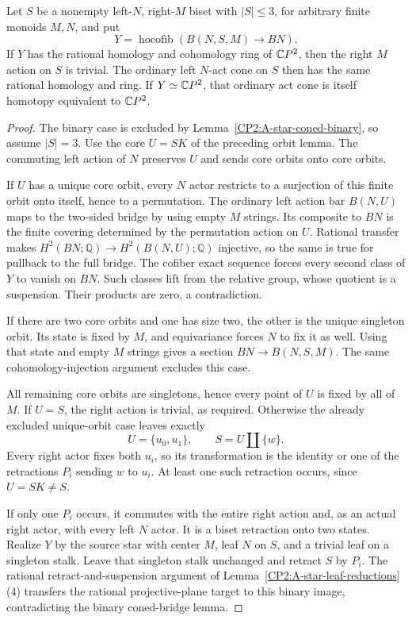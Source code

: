 \begin{theorem}
\label{CP2:A-coned-three-transfer-to-ordinary}
Let $S$ be a nonempty left-$N$, right-$M$ biset with
$|S|\leq3$, for arbitrary finite monoids $M,N$, and put
\[
 Y=\operatorname{hocofib}(B(N,S,M)\longrightarrow BN).
\]
If $Y$ has the rational homology and cohomology ring of
$\mathbb{C}P^2$, then the right $M$ action on $S$ is trivial.
The ordinary left $N$-act cone on $S$ then has the same
rational homology and ring. If $Y\simeq\mathbb{C}P^2$, that
ordinary act cone is itself homotopy equivalent to $\mathbb{C}P^2$.
\end{theorem}
\begin{proof}
The binary case is excluded by
Lemma~\ref{CP2:A-star-coned-binary}, so assume $|S|=3$.
Use the core $U=SK$ of the preceding orbit lemma. The
commuting left action of $N$ preserves $U$ and sends core
orbits onto core orbits.

If $U$ has a unique core orbit, every $N$ actor restricts
to a surjection of this finite orbit onto itself, hence
to a permutation. The ordinary left action bar $B(N,U)$
maps to the two-sided bridge by using empty $M$ strings.
Its composite to $BN$ is the finite covering determined
by the permutation action on $U$. Rational transfer makes
$H^2(BN;\mathbb Q)\to H^2(B(N,U);\mathbb Q)$ injective,
so the same is true for pullback to the full bridge.
The cofiber exact sequence forces every second class of
$Y$ to vanish on $BN$. Such classes lift from the relative
group, whose quotient is a suspension. Their products are
zero, a contradiction.

If there are two core orbits and one has size two, the
other is the unique singleton orbit. Its state is fixed
by $M$, and equivariance forces $N$ to fix it as well.
Using that state and empty $M$ strings gives a section
$BN\to B(N,S,M)$. The same cohomology-injection argument
excludes this case.

All remaining core orbits are singletons, hence every
point of $U$ is fixed by all of $M$. If $U=S$, the right
action is trivial, as required. Otherwise the already
excluded unique-orbit case leaves exactly
\[
 U=\{u_0,u_1\},\qquad S=U\amalg\{w\}.
\]
Every right actor fixes both $u_i$, so its transformation
is the identity or one of the retractions $P_i$ sending
$w$ to $u_i$. At least one such retraction occurs, since
$U=SK\ne S$.

If only one $P_i$ occurs, it commutes with the entire
right action and, as an actual right actor, with every
left $N$ actor. It is a biset retraction onto two states.
Realize $Y$ by the source star with center $M$, leaf $N$
on $S$, and a trivial leaf on a singleton stalk. Leave
that singleton stalk unchanged and retract $S$ by $P_i$.
The rational retract-and-suspension argument of
Lemma~\ref{CP2:A-star-leaf-reductions}(4) transfers the
rational projective-plane target to this binary image,
contradicting the binary coned-bridge lemma.


\end{proof}
